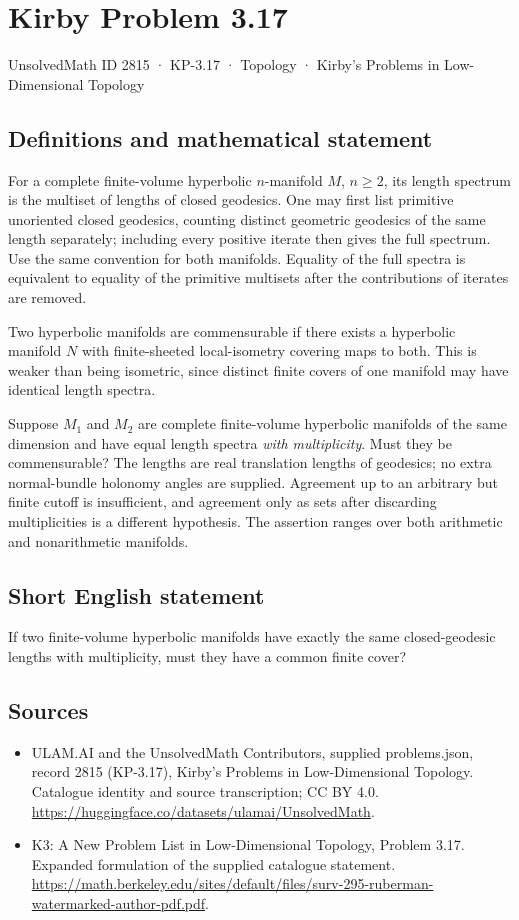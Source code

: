 \documentclass[11pt,a4paper]{article}
\begin{document}
\section*{Kirby Problem 3.17}\label{2815}
{\small UnsolvedMath ID 2815 · KP-3.17 · Topology · Kirby's Problems in Low-Dimensional Topology}
\subsection{Definitions and mathematical statement}
For a complete finite-volume hyperbolic $n$-manifold $M$, $n\geq2$, its
length spectrum is the multiset of lengths of closed geodesics. One may first
list primitive unoriented closed geodesics, counting distinct geometric
geodesics of the same length separately; including every positive iterate
then gives the full spectrum. Use the same convention for both manifolds.
Equality of the full spectra is equivalent to equality of the primitive
multisets after the contributions of iterates are removed.

Two hyperbolic manifolds are commensurable if there exists a hyperbolic
manifold $N$ with finite-sheeted local-isometry covering maps to both.
This is weaker than being isometric, since distinct finite covers of one
manifold may have identical length spectra.

Suppose $M_1$ and $M_2$ are complete finite-volume hyperbolic manifolds
of the same dimension and have equal length spectra \emph{with multiplicity}.
Must they be commensurable? The lengths are real translation lengths of
geodesics; no extra normal-bundle holonomy angles are supplied. Agreement
up to an arbitrary but finite cutoff is insufficient, and agreement only
as sets after discarding multiplicities is a different hypothesis. The
assertion ranges over both arithmetic and nonarithmetic manifolds.
\subsection{Short English statement}
If two finite-volume hyperbolic manifolds have exactly the same closed-geodesic lengths with multiplicity, must they have a common finite cover?
\subsection{Sources}
\begin{itemize}
\item[S1] ULAM.AI and the UnsolvedMath Contributors, supplied problems.json, record 2815 (KP-3.17), Kirby's Problems in Low-Dimensional Topology. Catalogue identity and source transcription; CC BY 4.0.
\url{https://huggingface.co/datasets/ulamai/UnsolvedMath}.
\item[S2] K3: A New Problem List in Low-Dimensional Topology, Problem 3.17. Expanded formulation of the supplied catalogue statement.
\url{https://math.berkeley.edu/sites/default/files/surv-295-ruberman-watermarked-author-pdf.pdf}.
\end{itemize}
\end{document}
